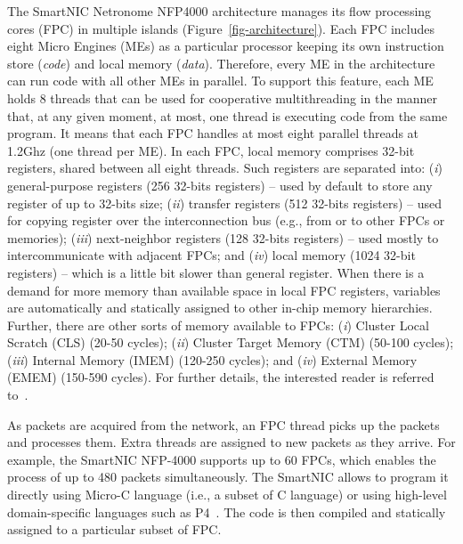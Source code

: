 The SmartNIC Netronome NFP4000 architecture manages its flow processing cores (FPC) in multiple islands (Figure~\ref{fig-architecture}). Each FPC includes eight Micro Engines (MEs) as a particular processor keeping its own instruction store (\textit{code}) and local memory (\textit{data}). 
Therefore, every ME in the architecture can run code with all other MEs in parallel. To support this feature, each ME holds 8 threads that can be used for cooperative multithreading in the manner that,  at any given moment, at most, one thread is executing code from the same program. It means that each FPC handles at most eight parallel threads at 1.2Ghz (one thread per ME). In each FPC, local memory comprises 32-bit registers, shared between all eight threads. Such registers are separated into: (\textit{i}) general-purpose registers (256 32-bits registers) -- used by default to store any register of up to 32-bits size; (\textit{ii}) transfer registers (512 32-bits registers) -- used for copying register over the interconnection bus (e.g., from or to other FPCs or memories); (\textit{iii}) next-neighbor registers (128 32-bits registers) -- used mostly to intercommunicate with adjacent FPCs; and (\textit{iv}) local memory (1024 32-bit registers) -- which is a little bit slower than general register. When there is a demand for more memory than available space in local FPC registers, variables are automatically and statically assigned to other in-chip memory hierarchies. Further, there are other sorts of memory available to FPCs: (\textit{i}) Cluster Local Scratch (CLS) (20-50 cycles); (\textit{ii}) Cluster Target Memory (CTM) (50-100 cycles); (\textit{iii}) Internal Memory (IMEM) (120-250 cycles); and (\textit{iv}) External Memory (EMEM) (150-590 cycles). For further details, the interested reader is referred to~\cite{netronomeArc}. 

As packets are acquired from the network, an FPC thread picks up the packets and processes them. Extra threads are assigned to new packets as they arrive. For example, the SmartNIC NFP-4000 supports up to 60 FPCs, which enables the process of up to 480 packets simultaneously. The SmartNIC allows to program it directly using Micro-C language (i.e., a subset of C language) or using high-level domain-specific languages such as P4~\cite{p4-ref}. The code is then compiled and statically assigned to a particular subset of FPC. 





